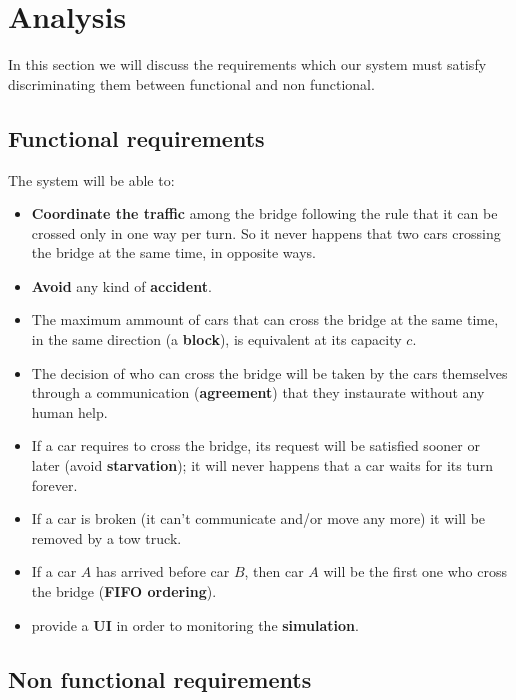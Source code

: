 \chapter{Analysis}\label{ch:analysis}

In this section we will discuss the requirements which our system must satisfy 
discriminating them between functional and non functional.

\section{Functional requirements}

The system will be able to:
\begin{itemize}
    \item \textbf{Coordinate the traffic} among the bridge following the rule 
        that it can be crossed only in one way per turn. 
        So it never happens that two cars crossing the bridge at the same time, 
        in opposite ways.
    \item \textbf{Avoid} any kind of \textbf{accident}.
    \item The maximum ammount of cars that can cross the bridge at the same time, 
        in the same direction (a \textbf{block}), is equivalent at its capacity $c$.
    \item The decision of who can cross the bridge will be taken by the cars 
        themselves through a communication (\textbf{agreement}) that they 
        instaurate without any human help.
    \item If a car requires to cross the bridge, its request will be satisfied sooner 
        or later (avoid \textbf{starvation}); 
        it will never happens that a car waits for its turn forever.
    \item If a car is broken (it can’t communicate and/or move any more) 
        it will be removed by a tow truck.
    \item If a car $A$ has arrived before car $B$, 
        then car $A$ will be the first one who cross the bridge (\textbf{FIFO ordering}).
    \item provide a \textbf{UI} in order to monitoring the \textbf{simulation}.
\end{itemize}


\section{Non functional requirements}

